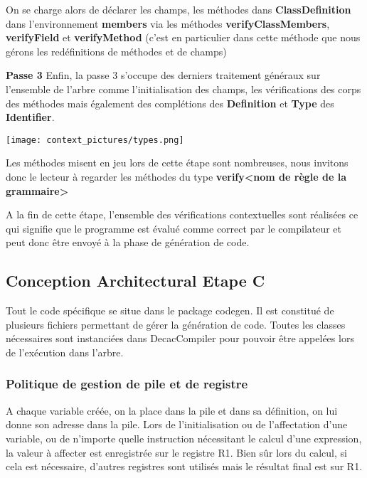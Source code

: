 \documentclass[12pt, a4paper, one side]{article}
\begin{document}
    On se charge alors de déclarer les champs, les méthodes dans
    \textbf{ClassDefinition} dans l'environnement \textbf{members} via les
    méthodes \textbf{verifyClassMembers}, \textbf{verifyField} et
    \textbf{verifyMethod} (c'est en particulier dans cette méthode que nous
    gérons les redéfinitions de méthodes et de champs)

    \textbf{Passe 3}
    Enfin, la passe 3 s'occupe des derniers traitement généraux sur l'ensemble de
    l'arbre comme l'initialisation des champs, les vérifications des corps des
    méthodes mais également des complétions des \textbf{Definition} et
    \textbf{Type} des \textbf{Identifier}.

    \texttt{[image: context\_pictures/types.png]}

    Les méthodes misent en jeu lors de cette étape sont nombreuses, nous
    invitons donc le lecteur à regarder les méthodes du type \textbf{verify<nom
    de règle de la grammaire>}

    A la fin de cette étape, l'ensemble des vérifications contextuelles sont
    réalisées ce qui signifie que le programme est évalué comme correct par le
    compilateur et peut donc être envoyé à la phase de génération de code.



    \subsection{Conception Architectural Etape C}

    Tout le code spécifique se situe dans le package codegen. Il est constitué
    de plusieurs fichiers
    permettant de gérer la génération de code. Toutes les classes nécessaires
    sont instanciées dans DecacCompiler
    pour pouvoir être appelées lors de l'exécution  dans l'arbre.

    \subsubsection{Politique de gestion de pile et de registre}

    A chaque variable créée, on la place dans la pile et dans sa définition, on
    lui donne son adresse dans la pile.
    Lors de l'initialisation ou de l'affectation d'une variable, ou de n'importe
    quelle instruction nécessitant le
    calcul d'une expression, la valeur à affecter est enregistrée sur le registre R1. Bien
    sûr lors du calcul, si cela est nécessaire,
    d'autres registres sont utilisés mais le résultat final est sur R1.
\end{document}
